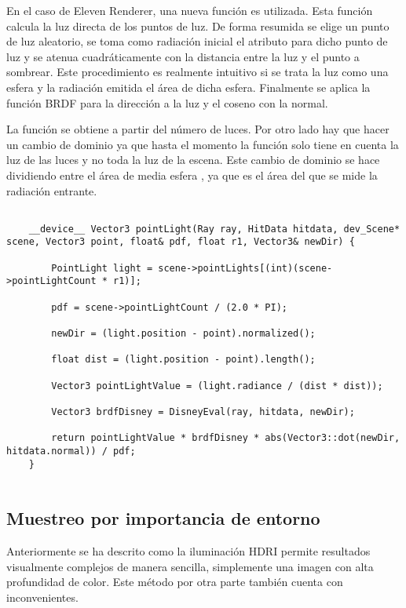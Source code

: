 En el caso de Eleven Renderer, una nueva función  es utilizada. Esta función calcula la luz directa de los puntos de luz. De forma resumida se elige un punto de luz aleatorio, se toma como radiación inicial el atributo  para dicho punto de luz y se atenua cuadráticamente con la distancia entre la luz y el punto a sombrear. Este procedimiento es realmente intuitivo si se trata la luz como una esfera y la radiación emitida el área de dicha esfera. Finalmente se aplica la función BRDF para la dirección a la luz y el coseno con la normal. 

La función  se obtiene a partir del número de luces. Por otro lado hay que hacer un cambio de dominio ya que hasta el momento la función  solo tiene en cuenta la luz de las luces y no toda la luz de la escena. Este cambio de dominio se hace dividiendo entre el área de media esfera , ya que es el área del que se mide la radiación entrante.

\begin{lstlisting}
	
	__device__ Vector3 pointLight(Ray ray, HitData hitdata, dev_Scene* scene, Vector3 point, float& pdf, float r1, Vector3& newDir) {

		PointLight light = scene->pointLights[(int)(scene->pointLightCount * r1)];

		pdf = scene->pointLightCount / (2.0 * PI);

		newDir = (light.position - point).normalized();

		float dist = (light.position - point).length();

		Vector3 pointLightValue = (light.radiance / (dist * dist));

		Vector3 brdfDisney = DisneyEval(ray, hitdata, newDir);

		return pointLightValue * brdfDisney * abs(Vector3::dot(newDir, hitdata.normal)) / pdf;
	}
	
\end{lstlisting}


\subsection{Muestreo por importancia de entorno}
	
Anteriormente se ha descrito como la iluminación HDRI permite resultados visualmente complejos de manera sencilla, simplemente una imagen con alta profundidad de color. Este método por otra parte también cuenta con inconvenientes. 

